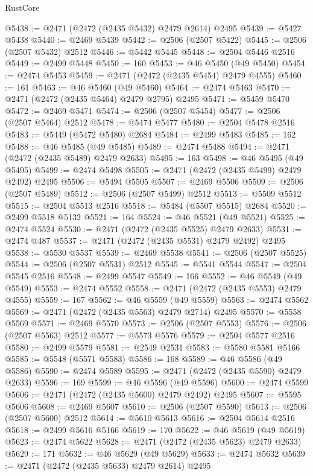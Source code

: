 \begin{lexlean}{RustCore}
\begin{coremodule}
@5438 := @2471 (@2472 (@2435 @5432) @2479 @2614) @2495
@5439 := @5427 @5438
@5440 := @2469 @5439
@5442 := @2506 (@2507 @5422)
@5445 := @2506 (@2507 @5432) @2512
@5446 := @5442 @5445
@5448 := @2504 @5446 @2516
@5449 := @2499 @5448
@5450 := 160
@5453 := @46 @5450 (@49 @5450)
@5454 := @2474 @5453
@5459 := @2471 (@2472 (@2435 @5454) @2479 @4555)
@5460 := 161
@5463 := @46 @5460 (@49 @5460)
@5464 := @2474 @5463
@5470 := @2471 (@2472 (@2435 @5464) @2479 @2795) @2495
@5471 := @5459 @5470
@5472 := @2469 @5471
@5474 := @2506 (@2507 @5454)
@5477 := @2506 (@2507 @5464) @2512
@5478 := @5474 @5477
@5480 := @2504 @5478 @2516
@5483 := @5449 (@5472 @5480) @2684
@5484 := @2499 @5483
@5485 := 162
@5488 := @46 @5485 (@49 @5485)
@5489 := @2474 @5488
@5494 := @2471 (@2472 (@2435 @5489) @2479 @2633)
@5495 := 163
@5498 := @46 @5495 (@49 @5495)
@5499 := @2474 @5498
@5505 := @2471 (@2472 (@2435 @5499) @2479 @2492) @2495
@5506 := @5494 @5505
@5507 := @2469 @5506
@5509 := @2506 (@2507 @5489)
@5512 := @2506 (@2507 @5499) @2512
@5513 := @5509 @5512
@5515 := @2504 @5513 @2516
@5518 := @5484 (@5507 @5515) @2684
@5520 := @2499 @5518 @5132
@5521 := 164
@5524 := @46 @5521 (@49 @5521)
@5525 := @2474 @5524
@5530 := @2471 (@2472 (@2435 @5525) @2479 @2633)
@5531 := @2474 @487
@5537 := @2471 (@2472 (@2435 @5531) @2479 @2492) @2495
@5538 := @5530 @5537
@5539 := @2469 @5538
@5541 := @2506 (@2507 @5525)
@5544 := @2506 (@2507 @5531) @2512
@5545 := @5541 @5544
@5547 := @2504 @5545 @2516
@5548 := @2499 @5547
@5549 := 166
@5552 := @46 @5549 (@49 @5549)
@5553 := @2474 @5552
@5558 := @2471 (@2472 (@2435 @5553) @2479 @4555)
@5559 := 167
@5562 := @46 @5559 (@49 @5559)
@5563 := @2474 @5562
@5569 := @2471 (@2472 (@2435 @5563) @2479 @2714) @2495
@5570 := @5558 @5569
@5571 := @2469 @5570
@5573 := @2506 (@2507 @5553)
@5576 := @2506 (@2507 @5563) @2512
@5577 := @5573 @5576
@5579 := @2504 @5577 @2516
@5580 := @2499 @5579
@5581 := @2549 @2531
@5583 := @5580 @5581 @5166
@5585 := @5548 (@5571 @5583)
@5586 := 168
@5589 := @46 @5586 (@49 @5586)
@5590 := @2474 @5589
@5595 := @2471 (@2472 (@2435 @5590) @2479 @2633)
@5596 := 169
@5599 := @46 @5596 (@49 @5596)
@5600 := @2474 @5599
@5606 := @2471 (@2472 (@2435 @5600) @2479 @2492) @2495
@5607 := @5595 @5606
@5608 := @2469 @5607
@5610 := @2506 (@2507 @5590)
@5613 := @2506 (@2507 @5600) @2512
@5614 := @5610 @5613
@5616 := @2504 @5614 @2516
@5618 := @2499 @5616 @5166
@5619 := 170
@5622 := @46 @5619 (@49 @5619)
@5623 := @2474 @5622
@5628 := @2471 (@2472 (@2435 @5623) @2479 @2633)
@5629 := 171
@5632 := @46 @5629 (@49 @5629)
@5633 := @2474 @5632
@5639 := @2471 (@2472 (@2435 @5633) @2479 @2614) @2495

\end{coremodule}
\end{lexlean}
